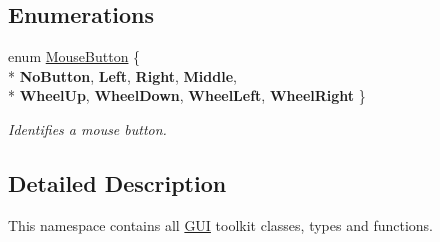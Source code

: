 \subsection*{Enumerations}
\begin{DoxyCompactItemize}
\item 
enum \hyperlink{namespaceGUI_ad06082a7b02aa73697f39eb8e0856de9}{Mouse\-Button} \{ \\*
{\bfseries No\-Button}, 
{\bfseries Left}, 
{\bfseries Right}, 
{\bfseries Middle}, 
\\*
{\bfseries Wheel\-Up}, 
{\bfseries Wheel\-Down}, 
{\bfseries Wheel\-Left}, 
{\bfseries Wheel\-Right}
 \}
\begin{DoxyCompactList}\small\item\em Identifies a mouse button. \end{DoxyCompactList}\end{DoxyCompactItemize}


\subsection{Detailed Description}
This namespace contains all \hyperlink{namespaceGUI}{G\-U\-I} toolkit classes, types and functions. 